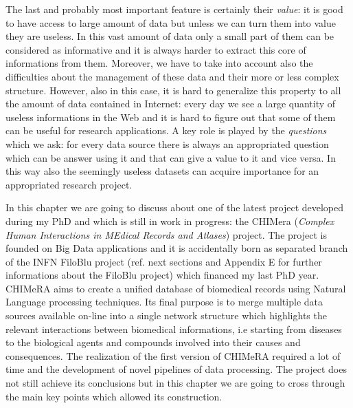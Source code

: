 \documentclass{standalone}
\begin{document}
The last and probably most important feature is certainly their \emph{value}: it is good to have access to large amount of data but unless we can turn them into value they are useless.
In this vast amount of data only a small part of them can be considered as informative and it is always harder to extract this core of informations from them.
Moreover, we have to take into account also the difficulties about the management of these data and their more or less complex structure.
However, also in this case, it is hard to generalize this property to all the amount of data contained in Internet: every day we see a large quantity of useless informations in the Web and it is hard to figure out that some of them can be useful for research applications.
A key role is played by the \emph{questions} which we ask: for every data source there is always an appropriated question which can be answer using it and that can give a value to it and vice versa.
In this way also the seemingly useless datasets can acquire importance for an appropriated research project.

In this chapter we are going to discuss about one of the latest project developed during my PhD and which is still in work in progress: the \textsf{CHIMera} (\emph{Complex Human Interactions in MEdical Records and Atlases}) project.
The project is founded on Big Data applications and it is accidentally born as separated branch of the INFN FiloBlu project (ref. next sections and Appendix E for further informations about the FiloBlu project) which financed my last PhD year.
\textsf{CHIMeRA} aims to create a unified database of biomedical records using Natural Language processing techniques.
Its final purpose is to merge multiple data sources available on-line into a single network structure which highlights the relevant interactions between biomedical informations, i.e starting from diseases to the biological agents and compounds involved into their causes and consequences.
The realization of the first version of \textsf{CHIMeRA} required a lot of time and the development of novel pipelines of data processing.
The project does not still achieve its conclusions but in this chapter we are going to cross through the main key points which allowed its construction.

\end{document}
